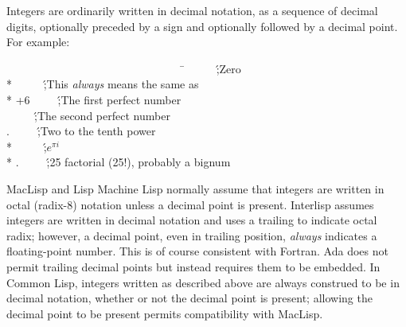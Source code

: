 Integers are ordinarily written in decimal notation, as a sequence
of decimal digits, optionally preceded by a sign and optionally followed
by a decimal point.
For example:
\begin{lisp}
~~~~~~~~~~~~~~~~~~~~~~~~~~~~~~~~\=\kill
{}~~~~~\';{\rm Zero} \\*
~~~~~\';{\rm This {\it always} means the same as } \\*
\>+6~~~~~\';{\rm The first perfect number} \\
~~~~~\';{\rm The second perfect number} \\
.~~~~~\';{\rm Two to the tenth power} \\*
~~~~~\';{\rm \(e^{\pi i}\)} \\*
.~~~~~\';{\rm 25 factorial (25!), probably a bignum}
\end{lisp}

\beforenoterule
\begin{incompatibility}
MacLisp and Lisp Machine Lisp normally assume that integers
are written in octal (radix-8) notation unless a decimal
point is present.
Interlisp assumes integers are written in decimal notation and uses a
trailing  to indicate octal radix; however, a decimal point,
even in trailing position, {\it always} indicates a floating-point number.
This is of course consistent with Fortran.  Ada does not permit
trailing decimal points but instead requires them to be embedded.
In Common Lisp, integers written as described
above are always construed to be
in decimal notation, whether or not the decimal point is present;
allowing the decimal point to be present permits compatibility with
MacLisp.
\end{incompatibility}
\afternoterule


